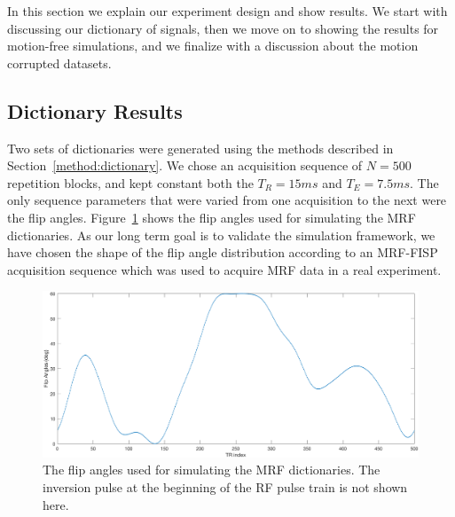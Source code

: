 
In this section we explain our experiment design and show results.
We start with discussing our dictionary of signals, 
then we move on to showing the results for motion-free simulations,
and we finalize with a discussion about the motion corrupted datasets.

\subsection{Dictionary Results}

Two sets of dictionaries were generated using the methods described in Section~\ref{method:dictionary}.
We chose an acquisition sequence of $N = 500$ repetition blocks, and kept constant both the $T_R = 15ms$ and $T_E = 7.5ms$.
The only sequence parameters that were varied from one acquisition to the next were the flip angles.
Figure~\ref{fig:FAsMaryia} shows the flip angles used for simulating the MRF dictionaries. 
As our long term goal is to validate the simulation framework, we have chosen the shape of the flip angle distribution according to an MRF-FISP acquisition sequence which was used to acquire MRF data in a real experiment.

\begin{figure}[ht]
    \centering
    \includegraphics[width=1\textwidth]{images/mrf/FAsMaryia}
    \caption{The flip angles used for simulating the MRF dictionaries.
    The inversion pulse at the beginning of the RF pulse train is not shown here.}
    \label{fig:FAsMaryia}
\end{figure}

\hfill

